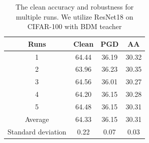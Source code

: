 \documentclass{article} %
\begin{document}
 



\begin{table}[t]
\begin{center}
\caption{The clean accuracy and robustness for multiple runs. We utilize ResNet18 on CIFAR-100 with BDM teacher}
\label{tab:mutiple_runs}
\setlength{\tabcolsep}{10pt}
\renewcommand{\arraystretch}{1}
\begin{tabular}{cccc}
\toprule
Runs & Clean & PGD & AA  \\
\midrule
1 & 64.44 & 36.19 & 30.32 \\
2 & 63.96 & 36.23 &  30.35 \\
3 &  64.56 & 36.01 &  30.27 \\
4 & 64.20 & 36.15 & 30.28  \\
5 & 64.48 & 36.15 &  30.31  \\

\midrule
Average & 64.33 & 36.15 & 30.31  \\
Standard deviation & 0.22 & 0.07 & 0.03 \\
\bottomrule
\end{tabular}
\end{center}
\vspace{-0.15 in}
\end{table}
\end{document}
